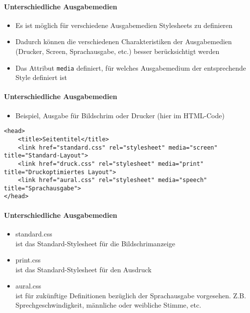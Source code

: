 \paragraph{Unterschiedliche Ausgabemedien}
\begin{itemize}[noitemsep,topsep=0pt,leftmargin=*]
    \item Es ist möglich für verschiedene Ausgabemedien Stylesheets zu definieren
    \item Dadurch können die verschiedenen Charakteristiken der Ausgabemedien (Drucker, Screen, Sprachausgabe, etc.) besser berücksichtigt werden
    \item Das Attribut \texttt{media} definiert, für welches Ausgabemedium der entsprechende Style definiert ist
\end{itemize}

\paragraph{Unterschiedliche Ausgabemedien}
\begin{itemize}[noitemsep,topsep=0pt,leftmargin=*]
    \item Beispiel, Ausgabe für Bildschrim oder Drucker (hier im HTML-Code)
\end{itemize}
\begin{lstlisting}
<head>
    <title>Seitentitel</title>
    <link href="standard.css" rel="stylesheet" media="screen" title="Standard-Layout">
    <link href="druck.css" rel="stylesheet" media="print" title="Druckoptimiertes Layout">
    <link href="aural.css" rel="stylesheet" media="speech" title="Sprachausgabe">
</head>
\end{lstlisting}

\paragraph{Unterschiedliche Ausgabemedien}
\begin{itemize}[noitemsep,topsep=0pt,leftmargin=*]
    \item standard.css\\ist das Standard-Stylesheet für die Bildschrimanzeige
    \item print.css\\ist das Standard-Stylesheet für den Ausdruck
    \item aural.css\\ist für zukünftige Definitionen bezüglich der Sprachausgabe vorgesehen. Z.B. Sprechgeschwindigkeit, männliche oder weibliche Stimme, etc.
\end{itemize}

